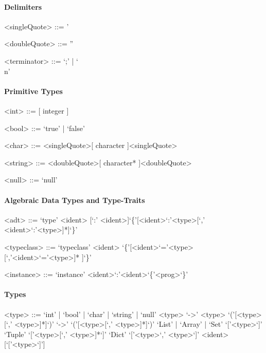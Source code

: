 \documentclass[11pt]{article} %
\begin{document}
\paragraph{Delimiters}

\begin{grammar}

<singleQuote> ::= '

<doubleQuote> ::= ''

<terminator> ::= `;' | `\\n'

\end{grammar}

\paragraph{Primitive Types}

\begin{grammar}

<int> ::= [ integer ]

<bool> ::= `true' | `false'

<char> ::= <singleQuote>[ character ]<singleQuote>

<string> ::= <doubleQuote>[ character* ]<doubleQuote>

<null> ::= `null'

\end{grammar}

\paragraph{Algebraic Data Types and Type-Traits}

\begin{grammar}

<adt> ::= `type' <ident> [`:' <ident>]`\{'[<ident>`:'<type>[`,' <ident>`:'<type>]*]`\}'
 
<typeclass> ::= `typeclass' <ident> `\{'[<ident>`='<type>[`,'<ident>`='<type>]* ]`\}'

<instance> ::= `instance' <ident>`:'<ident>`\{'<prog>`\}'

\end{grammar}

\paragraph{Types}

\begin{grammar}

<type> ::= `int' | `bool' | `char' | `string' | `null'
\alt <type> `->' <type>
\alt `('[<type>[`,' <type>]*]`)' `->' `('[<type>[`,' <type>]*]`)'
\alt `List' | `Array' | `Set' `['<type>`]'
\alt `Tuple' `['<type>[`,' <type>]*`]'
\alt `Dict' `['<type>`,' <type>`]'
\alt <ident>[`['<type>`]']

\end{grammar}
\end{document}
